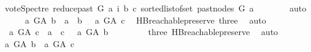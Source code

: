 \begin{isabellebody}
\ {\isacharparenleft}{\kern0pt}vote{\isacharunderscore}{\kern0pt}Spectre\ {\isacharparenleft}{\kern0pt}reduce{\isacharunderscore}{\kern0pt}past\ G\ a{\isacharparenright}{\kern0pt}\ i\ b\ c{\isacharparenright}{\kern0pt}{\isacharparenright}{\kern0pt}\ {\isacharparenleft}{\kern0pt}sorted{\isacharunderscore}{\kern0pt}list{\isacharunderscore}{\kern0pt}of{\isacharunderscore}{\kern0pt}set\ {\isacharparenleft}{\kern0pt}past{\isacharunderscore}{\kern0pt}nodes\ G\ a{\isacharparenright}{\kern0pt}{\isacharparenright}{\kern0pt}{\isacharparenright}{\kern0pt}{\isacharparenright}{\kern0pt}{\isacharparenright}{\kern0pt}{\isacharparenright}{\kern0pt}{\isachardoublequoteclose}\isanewline
\ \ \ \ \ \ \isamarkupfalse%
\ auto\isanewline
\ \ \ \ \isamarkupfalse%
\ {\isachardoublequoteopen}{\isasymnot}{\isacharparenleft}{\kern0pt}{\isacharparenleft}{\kern0pt}a\ {\isasymrightarrow}\isactrlsup {\isacharplus}{\kern0pt}\isactrlbsub G{\isacharunderscore}{\kern0pt}A\isactrlesub \ b\ {\isasymor}\ a\ {\isacharequal}{\kern0pt}\ b{\isacharparenright}{\kern0pt}\ {\isasymand}\ {\isacharparenleft}{\kern0pt}{\isasymnot}\ a\ {\isasymrightarrow}\isactrlsup {\isacharplus}{\kern0pt}\isactrlbsub G{\isacharunderscore}{\kern0pt}A\isactrlesub \ c{\isacharparenright}{\kern0pt}{\isacharparenright}{\kern0pt}{\isachardoublequoteclose}\ \isamarkupfalse%
\ HB{}{\isachardot}{\kern0pt}reachable{}{\isacharunderscore}{\kern0pt}preserve\ three\ \isamarkupfalse%
\ auto\isanewline
\ \ \ \ \isamarkupfalse%
\ \isamarkupfalse%
\ {\isachardoublequoteopen}{\isasymnot}\ {\isacharparenleft}{\kern0pt}{\isacharparenleft}{\kern0pt}a\ {\isasymrightarrow}\isactrlsup {\isacharplus}{\kern0pt}\isactrlbsub G{\isacharunderscore}{\kern0pt}A\isactrlesub \ c\ {\isasymor}\ a\ {\isacharequal}{\kern0pt}\ c{\isacharparenright}{\kern0pt}\ {\isasymand}\ {\isacharparenleft}{\kern0pt}{\isasymnot}\ a\ {\isasymrightarrow}\isactrlsup {\isacharplus}{\kern0pt}\isactrlbsub G{\isacharunderscore}{\kern0pt}A\isactrlesub \ b{\isacharparenright}{\kern0pt}{\isacharparenright}{\kern0pt}{\isachardoublequoteclose}\ \isanewline
\ \ \ \ \ \ \isamarkupfalse%
\ three\ HB{}{\isachardot}{\kern0pt}reachable{}{\isacharunderscore}{\kern0pt}preserve\ \isamarkupfalse%
\ auto\isanewline
\ \ \ \ \isamarkupfalse%
\ \isamarkupfalse%
\ {\isachardoublequoteopen}a\ {\isasymrightarrow}\isactrlsup {\isacharplus}{\kern0pt}\isactrlbsub G{\isacharunderscore}{\kern0pt}A\isactrlesub \ b\ {\isasymand}\ a\ {\isasymrightarrow}\isactrlsup {\isacharplus}{\kern0pt}\isactrlbsub G{\isacharunderscore}{\kern0pt}A\isactrlesub \ c{\isachardoublequoteclose}\ \isamarkupfalse%

\end{isabellebody}
